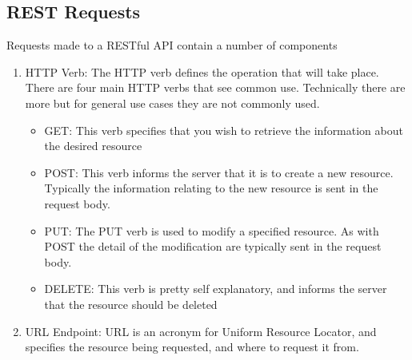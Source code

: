 \subsection{REST Requests}
Requests made to a RESTful API contain a number of components
\begin{enumerate}
\item{HTTP Verb: The HTTP verb defines the operation that will take place. There are four main HTTP verbs that see common use. Technically there are more but for general use cases they are not commonly used.}
\begin{itemize}
    \item GET: This verb specifies that you wish to retrieve the information about the desired resource
    \item POST: This verb informs the server that it is to create a new resource. Typically the information relating to the new resource is sent in the request body.
    \item PUT: The PUT verb is used to modify a specified resource. As with POST the detail of the modification are typically sent in the request body.
    \item DELETE: This verb is pretty self explanatory, and informs the server that the resource should be deleted
\end{itemize}
\item{URL Endpoint: URL is an acronym for Uniform Resource Locator, and specifies the resource being requested, and where to request it from.

}
\end{enumerate}
